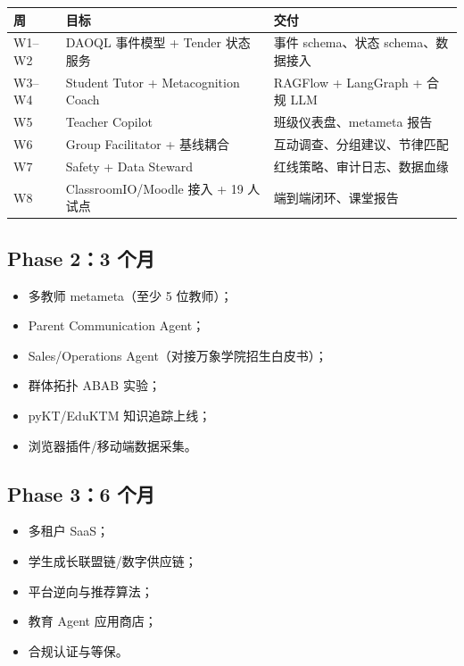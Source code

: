 \documentclass[UTF8,a4paper,11pt]{ctexart}
\begin{document}
\begin{center}
\begin{longtable}{@{}p{1.6cm}p{4.6cm}p{7.4cm}@{}}
\toprule
\textbf{周} & \textbf{目标} & \textbf{交付} \\
\midrule
W1--W2 & DAOQL 事件模型 + Tender 状态服务 & 事件 schema、状态 schema、数据接入 \\
W3--W4 & Student Tutor + Metacognition Coach & RAGFlow + LangGraph + 合规 LLM \\
W5 & Teacher Copilot & 班级仪表盘、metameta 报告 \\
W6 & Group Facilitator + 基线耦合 & 互动调查、分组建议、节律匹配 \\
W7 & Safety + Data Steward & 红线策略、审计日志、数据血缘 \\
W8 & ClassroomIO/Moodle 接入 + 19 人试点 & 端到端闭环、课堂报告 \\
\bottomrule
\end{longtable}
\end{center}

\subsection{Phase 2：3 个月}

\begin{itemize}[leftmargin=2em]
\item 多教师 metameta（至少 5 位教师）；
\item Parent Communication Agent；
\item Sales/Operations Agent（对接万象学院招生白皮书）；
\item 群体拓扑 ABAB 实验；
\item pyKT/EduKTM 知识追踪上线；
\item 浏览器插件/移动端数据采集。
\end{itemize}

\subsection{Phase 3：6 个月}

\begin{itemize}[leftmargin=2em]
\item 多租户 SaaS；
\item 学生成长联盟链/数字供应链；
\item 平台逆向与推荐算法；
\item 教育 Agent 应用商店；
\item 合规认证与等保。
\end{itemize}
\end{document}
